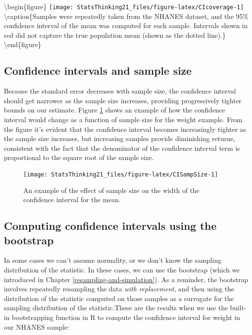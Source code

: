 \documentclass[12pt,]{book}
\theoremstyle{definition}
\theoremstyle{definition}
\theoremstyle{definition}
\theoremstyle{remark}
\begin{document}
\textbackslash{}begin\{figure\}
\texttt{[image: StatsThinking21\_files/figure-latex/CIcoverage-1]} \textbackslash{}caption\{Samples were repeatedly taken from the NHANES dataset, and the 95\% confidence interval of the mean was computed for each sample. Intervals shown in red did not capture the true population mean (shown as the dotted line).\}\label{fig:CIcoverage}
\textbackslash{}end\{figure\}

\hypertarget{confidence-intervals-and-sample-size}{%
\subsection{Confidence intervals and sample size}\label{confidence-intervals-and-sample-size}}

Because the standard error decreases with sample size, the confidence interval should get narrower as the sample size increases, providing progressively tighter bounds on our estimate. Figure \ref{fig:CISampSize} shows an example of how the confidence interval would change as a function of sample size for the weight example. From the figure it's evident that the confidence interval becomes increasingly tighter as the sample size increases, but increasing samples provide diminishing returns, consistent with the fact that the denominator of the confidence interval term is proportional to the square root of the sample size.

\begin{figure}
\texttt{[image: StatsThinking21\_files/figure-latex/CISampSize-1]} \caption{An example of the effect of sample size on the width of the confidence interval for the mean.}\label{fig:CISampSize}
\end{figure}

\hypertarget{computing-confidence-intervals-using-the-bootstrap}{%
\subsection{Computing confidence intervals using the bootstrap}\label{computing-confidence-intervals-using-the-bootstrap}}

In some cases we can't assume normality, or we don't know the sampling distribution of the statistic. In these cases, we can use the bootstrap (which we introduced in Chapter \ref{resampling-and-simulation}). As a reminder, the bootstrap involves repeatedly resampling the data \emph{with replacement}, and then using the distribution of the statistic computed on those samples as a surrogate for the sampling distribution of the statistic.These are the results when we use the built-in bootstrapping function in R to compute the confidence interval for weight in our NHANES sample:
\end{document}
